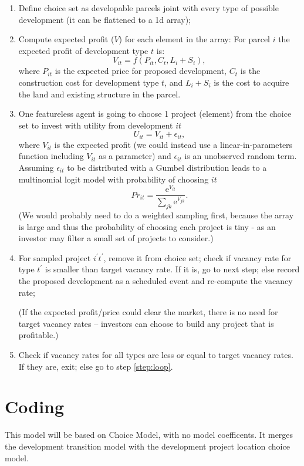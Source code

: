 \documentclass{article}
\begin{document}
\begin{enumerate}
\item Define choice set as developable parcels joint with every type of possible development (it can be flattened to a 1d array);
\item Compute expected profit ($V$) for each element in the array:
For parcel $i$ the expected profit of development type $t$ is:
\begin{equation}
    V_{it} = f(P_{it}, C_t, L_i+S_i),
\end{equation}
where $P_{it}$ is the expected price for proposed development, $C_t$ is the construction cost for development type $t$, and $L_i+S_i$ is the cost to acquire the land and existing structure in the parcel.
\item \label{step:loop} One featureless agent is going to choose 1 project (element) from the choice set to invest with utility from development $it$
\begin{equation}
    U_{it} = V_{it} + \epsilon_{it},
\end{equation}
where $V_{it}$ is the expected profit (we could instead use a linear-in-parameters function including $V_{it}$ as a parameter) and $\epsilon_{it}$ is an unobserved random term. Assuming $\epsilon_{it}$ to be distributed with a Gumbel distribution leads to a multinomial logit model with probability of choosing $it$
\begin{equation}
Pr_{it} = \frac{\mathrm{e}^{V_{it}}}{\sum_{jk} {\mathrm{e}^{V_{jk}}}}.
\end{equation}
(We would probably need to do a weighted sampling first, because the array is large and thus the probability of choosing each project is tiny - as an investor may filter a small set of projects to consider.)
\item For sampled project $i^{\prime}t^{\prime}$, remove it from choice set;  check if vacancy rate for type $t^{\prime}$ is smaller than target vacancy rate. If it is, go to next step; else record the proposed development as a scheduled event and re-compute the vacancy rate;

(If the expected profit/price could clear the market, there is no need for target vacancy rates -- investors can choose to build any project that is profitable.)
\item Check if vacancy rates for all types are less or equal to target vacancy rates. If they are, exit; else go to step \ref{step:loop}.
\end{enumerate}

\section{Coding}
This model will be based on Choice Model, with no model coefficents. It merges the development transition model with the development project location choice model. 
\end{document}
